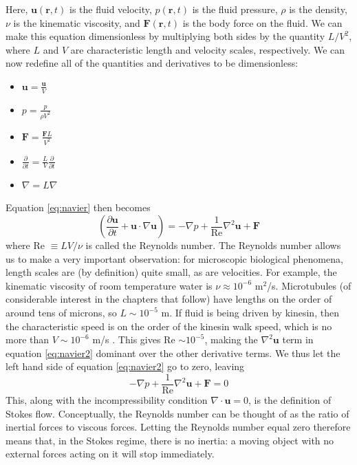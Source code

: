 \documentclass[11pt]{ucthesis}
\begin{document}
Here, $\mathbf{u}(\mathbf{r},t)$ is the fluid velocity, $p(\mathbf{r},t)$ is the fluid pressure, $\rho$ is the density, $\nu$ is the kinematic viscosity, and $\mathbf{F}(\mathbf{r},t)$ is the body force on the fluid. We can make this equation dimensionless by multiplying both sides by the quantity $L/V^2$, where $L$ and $V$ are characteristic length and velocity scales, respectively. We can now redefine all of the quantities and derivatives to be dimensionless:
\begin{itemize}
\item $\mathbf{u} = \frac{\mathbf{u}}{V}$
\item $p = \frac{p}{\rho V^2}$
\item $\mathbf{F} = \frac{\mathbf{F}L}{V^2}$
\item $\frac{\partial}{\partial t} = \frac{L}{V}\frac{\partial}{\partial t}$
\item $\nabla = L\nabla$
\end{itemize} 
Equation \ref{eq:navier} then becomes 
\begin{equation}
\label{eq:navier2}
\left(\frac{\partial \mathbf{u}}{\partial t} + \mathbf{u}\cdot\nabla\mathbf{u}\right) = -\nabla p + \frac{1}{\text{Re}}\nabla^2\mathbf{u} + \mathbf{F}
\end{equation}
where Re $\equiv LV/\nu$ is called the Reynolds number. The Reynolds number allows us to make a very important observation: for microscopic biological phenomena, length scales are (by definition) quite small, as are velocities. For example, the kinematic viscosity of room temperature water is $\nu\approx 10^{-6}$ m$^2$/s. Microtubules (of considerable interest in the chapters that follow) have lengths on the order of around tens of microns, so $L\sim10^{-5}$ m. If fluid is being driven by kinesin, then the characteristic speed is on the order of the kinesin walk speed, which is no more than $V\sim10^{-6}$ m/s \cite{vale1985identification,vale1996direct}. This gives Re $\sim10^{-5}$, making the $\nabla^2\mathbf{u}$ term in equation \ref{eq:navier2} dominant over the other derivative terms. We thus let the left hand side of equation \ref{eq:navier2} go to zero, leaving
\begin{equation}
\label{eq:lowRe}
-\nabla p + \frac{1}{\text{Re}}\nabla^2\mathbf{u} + \mathbf{F} = 0
\end{equation} 
This, along with the incompressibility condition $\nabla \cdot \mathbf u = 0$, is the definition of Stokes flow. Conceptually, the Reynolds number can be thought of as the ratio of inertial forces to viscous forces. Letting the Reynolds number equal zero therefore means that, in the Stokes regime, there is no inertia: a moving object with no external forces acting on it will stop immediately.
\end{document}
